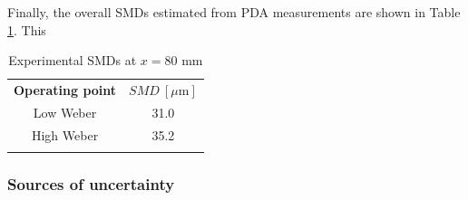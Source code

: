 Finally, the overall SMDs estimated from PDA measurements are shown in Table \ref{tab:becker_hassa_SMD_values_sprays}. This 

\begin{table}[!h]
\centering
\caption{Experimental SMDs at $x = 80$ mm  }
\begin{tabular}{cc}
\thickhline
\textbf{Operating point} & $SMD~\left[ \mu \mathrm{m}\right]$  \\
\thickhline
Low Weber & 31.0  \\  
High Weber & 35.2 \\
\thickhline
\end{tabular}
\label{tab:becker_hassa_SMD_values_sprays}
\end{table}

\clearpage

\subsubsection*{Sources of uncertainty}


